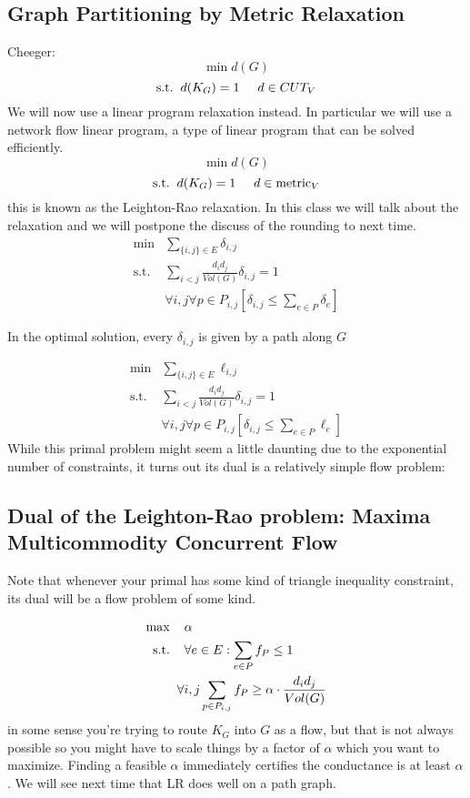\documentclass[11pt]{article}
\begin{document}
\subsection*{Graph Partitioning by Metric Relaxation}
Cheeger:
\[
    \min d(G)
\]
\[
    \text{s.t.}\hspace{2mm} d(K_G) = 1 \hspace{5mm} d \in CUT_V
\]
We will now use a linear program relaxation instead. In particular we will use a network flow linear program, a type of linear program that can be solved efficiently.
\[
    \min d(G)
\]
\[
    \text{s.t.}\hspace{2mm} d(K_G) = 1 \hspace{5mm} d \in \text{metric}_V
\]
this is known as the Leighton-Rao relaxation. In this class we will talk about the relaxation and we will postpone the discuss of the rounding to next time.
\begin{align*}
    \min & \sum_{\{i,j\} \in E} \delta_{i,j}\\
    \text{s.t.} & \sum_{i <j} \frac{d_id_j}{Vol(G)}\delta_{i,j} = 1\\
    &\forall i,j \forall p \in P_{i,j} \left[\delta_{i,j} \leq \sum_{e \in P}\delta_e\right]
\end{align*}

In the optimal solution, every $\delta_{i,j}$ is given by a path along $G$

\begin{align*}
    \min & \sum_{\{i,j\} \in E} \ell_{i,j}\\
    \text{s.t.} & \sum_{i <j} \frac{d_id_j}{Vol(G)}\delta_{i,j} = 1\\
    &\forall i,j \forall p \in P_{i,j} \left[\delta_{i,j} \leq \sum_{e \in P}\ell_e\right]
\end{align*}
While this primal problem might seem a little daunting due to the exponential number of constraints, it turns out its dual is a relatively simple flow problem:
\subsection*{Dual of the Leighton-Rao problem: Maxima Multicommodity Concurrent Flow}
Note that whenever your primal has some kind of triangle inequality constraint, its dual will be a flow problem of some kind.

\begin{align*}
    \max \hspace{2mm}&\hspace{2mm} \alpha \\
    \text{s.t.}\hspace{2mm} &\hspace{2mm}\forall e \in E: \sum _{e \in P} f_P \leq 1\\
    &\forall i,j  \sum_{p \in P_{i,j}}f_P \geq  \alpha \cdot \frac{d_id_j}{Vol(G)}
\end{align*}
in some sense you're trying to route $K_G$ into $G$ as a flow, but that is not always possible so you might have to scale things by a factor of $
\alpha$ which you want to maximize. Finding a feasible $\alpha$ immediately certifies the conductance is at least $\alpha$. We will see next time that LR does well on a path graph.
\end{document}
